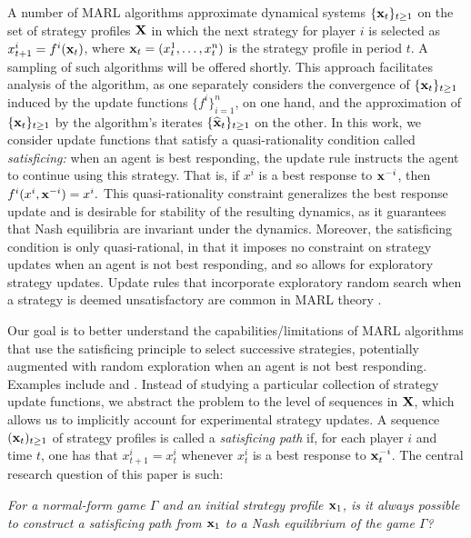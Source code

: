 A number of MARL algorithms approximate dynamical systems $\{ {\mathbf{x}}_t \}_{t \geq 1}$ on the set of strategy profiles ${\mathbf{X}}$ in which the next strategy for player $i$ is selected as $x^i_{t+1} = f^i ( {\mathbf{x}}_t)$, where ${\mathbf{x}}_t = ( x^1_t, \dots, x^n_t )$ is the strategy profile in period $t$. A sampling of such algorithms will be offered shortly. This approach facilitates analysis of the algorithm, as one separately considers the convergence of $\{ {\mathbf{x}}_t \}_{t \geq 1}$ induced by the update functions $\{ f^i \}_{i = 1}^n$, on one hand, and the approximation of $\{ {\mathbf{x}}_t \}_{t \geq 1}$ by the algorithm's iterates $\{ \widehat{{\mathbf{x}}}_t \}_{t \geq 1}$ on the other. In this work, we consider update functions that satisfy a quasi-rationality condition called \emph{satisficing:} when an agent is best responding, the update rule instructs the agent to continue using this strategy. That is, if $x^i $ is a best response to ${\mathbf{x}}^{-i}$, then $f^i ( x^i, {\mathbf{x}}^{-i}) = x^i.$ This quasi-rationality constraint generalizes the best response update and is desirable for stability of the resulting dynamics, as it guarantees that Nash equilibria are invariant under the dynamics. Moreover, the satisficing condition is only quasi-rational, in that it imposes no constraint on strategy updates when an agent is not best responding, and so allows for exploratory strategy updates. Update rules that incorporate exploratory random search when a strategy is deemed unsatisfactory are common in MARL theory \cite{blume1993statistical,marden2012revisiting,chasparis2013aspiration, marden2014achieving}.


Our goal is to better understand the capabilities/limitations of MARL algorithms that use the satisficing principle to select successive strategies, potentially augmented with random exploration when an agent is not best responding. {Examples include \cite{foster2006regret, germano2007global,marden2009payoff,chien2011convergence,candogan2013near, arslan2017decentralized} and \cite{yongacoglu2023satisficing}.} Instead of studying a particular collection of strategy update functions, we abstract the problem to the level of sequences in ${\mathbf{X}}$, which allows us to implicitly account for experimental strategy updates. A sequence $({\mathbf{x}}_t )_{t \geq 1}$ of strategy profiles is called a \emph{satisficing path} if, for each player $i$ and time $t$, one has that $x^i_{t+1} = x^i_t$ whenever $x^i_t$ is a best response to ${\mathbf{x}}^{-i}_t$. The central research question of this paper is such:


\begin{center}
    \textit{For a normal-form game $\Gamma$ and an initial strategy profile ${\mathbf{x}}_1$, is it always possible to construct a satisficing path from ${\mathbf{x}}_1$ to a Nash equilibrium of the game $\Gamma$?}
\end{center}




